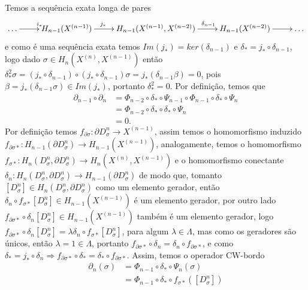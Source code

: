 \documentclass[12pt]{book}
\newcommand{\celula}[2]{D^{#1}_{#2}}
\newcommand{\celulabordo}[2]{\partial D^{#1}_{#2}}
\newcommand{\skeleton}[1]{X^{(#1)}}
\newcommand{\homologia}[2]{H_{#1}(#2)}
\newcommand{\homologiarel}[3]{H_{#1}(#2,#3)}
\newcommand{\homologiarelcel}[3]{H_{#1}(D^{#2}_{#3}, \partial D^{#2}_{#3})}
\newcommand{\homologiarelskelesimpl}[2]{H_{#1}(X^{(#2)}, X^{(#2-1)})}
\begin{document}
{	 Temos a sequência exata longa de pares
	\[
	\xymatrix{
		\dots \ar[r]^{i_{*}} &
		\homologia{n-1}{\skeleton{n-1}}\ar[r]^{j_{*}\qquad} &
		\homologiarel{n-1}{\skeleton{n-1}}{\skeleton{n-2}} \ar[r]^{\qquad \delta_{n-1}}&
		\homologia{n-1}{\skeleton{n-2}} \ar[r] & \dots
	}
	\]	
	e como é uma sequência exata temos $Im(j_{*})=ker(\delta_{n-1})$ e $\delta_{*} = j_{*}\circ \delta_{n-1}$, logo dado $\sigma \in \homologiarelskelesimpl{n}{n}$ então $\delta_{*}^{2}\sigma = (j_{*}\circ \delta_{n-1})\circ(j_{*}\circ \delta_{n-1})\sigma = j_{*}( \delta_{n-1}\beta) = 0$, pois $\beta = j_{*}(\delta_{n-1}\sigma) \in Im(j_{*})$, portanto $\delta_{*}^{2} = 0$. Por definição, temos que 
	$$
	\begin{aligned}
		\partial_{n-1}\circ \partial_{n} 
		&= \Phi_{n-2} \circ \delta_{*} \circ \Psi_{n-1} \circ \Phi_{n-1} \circ \delta_{*} \circ \Psi_{n}
		\\
		&=\Phi_{n-2} \circ \delta_{*} \circ  \delta_{*} \circ \Psi_{n}
		\\
		&=0.
	\end{aligned}
	$$
	Por definição temos $f_{\partial\sigma}: \celulabordo{n}{\sigma} \to \skeleton{n-1}$, assim temos o homomorfismo induzido $f_{\partial\sigma*}: \homologia{n-1}{\celulabordo{n}{\sigma} }\to \homologia{n-1}{\skeleton{n-1}}$, analogamente, temos o homomorfismo $f_{\sigma*}:\homologiarelcel{n}{n}{\sigma} \to \homologiarelskelesimpl{n}{n}$ e o homomorfismo conectante $\delta_{n} : \homologiarelcel{n}{n}{\sigma} \to \homologia{n-1}{\celulabordo{n}{\sigma}}$ de modo que, tomanto $[\celula{n}{\sigma}] \in \homologiarelcel{n}{n}{\sigma}$ como um elemento gerador, então $\delta_{n}\circ f_{\sigma*}[\celula{n}{\sigma}] \in \homologia{n-1}{\skeleton{n-1}}$ é um elemento gerador, por outro lado $f_{\partial\sigma*}\circ \delta_{n}[\celula{n}{\sigma}] \in \homologia{n-1}{\skeleton{n-1}}$ também é um elemento gerador, logo $f_{\partial\sigma*}\circ \delta_{n}[\celula{n}{\sigma}] = \lambda \delta_{n}\circ f_{\sigma*}[\celula{n}{\sigma}]$, para algum $\lambda \in \Lambda$, mas como os geradores são únicos, então $\lambda = 1 \in \Lambda$, portanto $f_{\partial\sigma*}\circ \delta_{n} = \delta_{n}\circ f_{\partial\sigma*}$, e como $\delta_{*} = j_{*}\circ\delta_{n} \Rightarrow f_{\partial\sigma*}\circ \delta_{*} = \delta_{*}\circ f_{\partial\sigma*}$. Assim, temos o operador CW-bordo
	$$
	\begin{aligned}
	\partial_{n}(\sigma) &= \Phi_{n-1}\circ\delta_{*}\circ\Psi_{n}(\sigma)
	\\
	&= \Phi_{n-1}\circ\delta_{*}\circ f_{\sigma*}([\celula{n}{\sigma}])

\end{aligned}$$}
\end{document}
